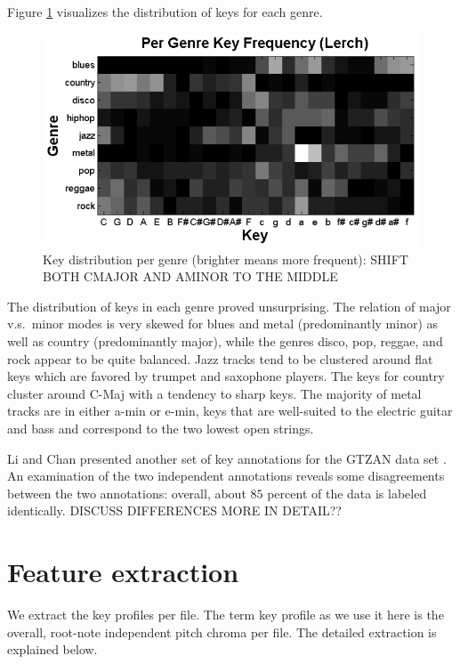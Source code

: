 \documentclass{article}
\begin{document}
Figure \ref{fig:KeyDistributionPerGenre} visualizes the distribution of keys for each genre.
\begin{figure}
    \includegraphics[scale=.4]{graph/key_distribution}
	\caption{Key distribution per genre (brighter means more frequent): SHIFT BOTH CMAJOR AND AMINOR TO THE MIDDLE}
	\label{fig:KeyDistributionPerGenre}
\end{figure}
The distribution of keys in each genre proved unsurprising.
The relation of major v.s.\ minor modes is very skewed for blues and metal (predominantly minor) as well as country (predominantly major), while the genres disco, pop, reggae, and rock appear to be quite balanced.
Jazz tracks tend to be clustered around flat keys which are favored by trumpet and saxophone players. 
The keys for country cluster around C-Maj with a tendency to sharp keys.
The majority of metal tracks are in either a-min or e-min, keys that are well-suited to the electric guitar and bass and correspond to the two lowest open strings.


Li and Chan presented another set of key annotations for the GTZAN data set \cite{li_genre_2011}. An examination of the two independent annotations reveals some disagreements between the two annotations: overall, about $85$ percent of the data is labeled identically.
DISCUSS DIFFERENCES MORE IN DETAIL??

\section{Feature extraction}\label{sec:pitch_chroma}
We extract the key profiles per file. The term key profile as we use it here is the overall, root-note independent pitch chroma per file. The detailed extraction is explained below.
\end{document}
